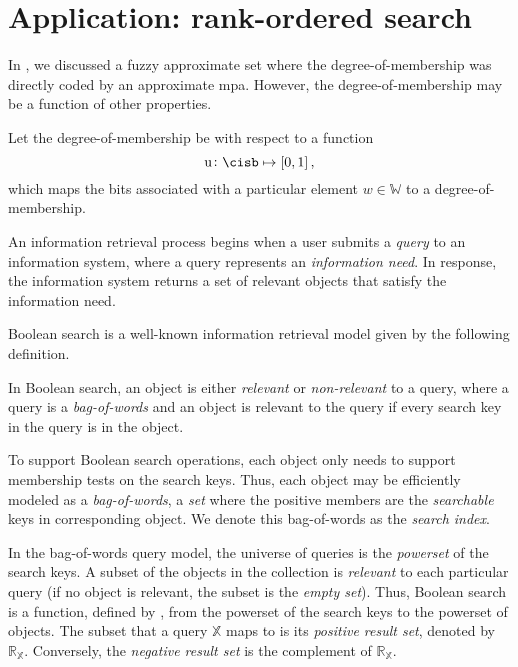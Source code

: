 \documentclass[ ../main.tex]{subfiles}
\begin{document}
\section{Application: rank-ordered search}
In \cite{}, we discussed a fuzzy approximate set where the degree-of-membership was directly coded by an approximate mpa. However, the degree-of-membership may be a function of other properties.

Let the degree-of-membership be with respect to a function
\begin{equation}
    \operatorname{u} \colon \cisb \mapsto [0,1]\,,
\end{equation}
which maps the bits associated with a particular element $w \in \mathbb{W}$ to a degree-of-membership.

An information retrieval process begins when a user submits a \emph{query} to an information system, where a query represents an \emph{information need}. In response, the information system returns a set of relevant objects that satisfy the information need.

Boolean search is a well-known information retrieval model given by the following definition.
\begin{definition}
In Boolean search, an object is either \emph{relevant} or \emph{non-relevant} to a query, where a query is a \emph{bag-of-words} and an object is relevant to the query if every search key in the query is in the object.
\end{definition}
To support Boolean search operations, each object only needs to support membership tests on the search keys. Thus, each object may be efficiently modeled as a \emph{bag-of-words}, a \emph{set} where the positive members are the \emph{searchable} keys in corresponding object. We denote this bag-of-words as the \emph{search index}.

In the bag-of-words query model, the universe of queries is the \emph{powerset} of the search keys. A subset of the objects in the collection is \emph{relevant} to each particular query (if no object is relevant, the subset is the \emph{empty set}). Thus, Boolean search is a function, defined by , from the powerset of the search keys to the powerset of objects. The subset that a query $\mathbb{X}$ maps to is its \emph{positive result set}, denoted by $\mathbb{R}_{\mathbb{X}}$. Conversely, the \emph{negative result set} is the complement of $\mathbb{R}_{\mathbb{X}}$.
\end{document}
